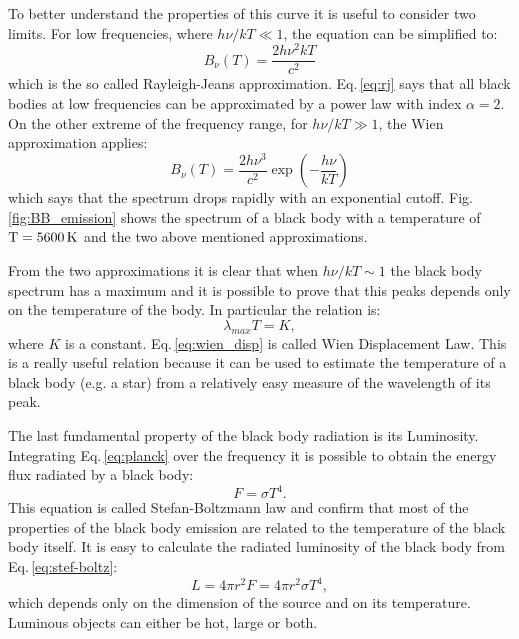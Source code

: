 \documentclass[../main.tex]{subfiles}
\begin{document}
To better understand the properties of this curve it is useful to consider two limits.
For low frequencies, where $h\nu/kT \ll 1$, the equation can be simplified to:
\begin{equation}
    \label{eq:rj}
    B_{\nu}(T) = \frac{2h\nu^2kT}{c^2}
\end{equation}
which is the so called Rayleigh-Jeans approximation.
Eq.\,\ref{eq:rj} says that all black bodies at low frequencies can be approximated by a power law with index $\alpha = 2$.
On the other extreme of the frequency range, for $h\nu/kT \gg 1$, the Wien approximation applies:
\begin{equation}
    \label{eq:wien}
    B_{\nu}(T) = \frac{2h\nu^3}{c^2}\exp\left(-\frac{h\nu}{kT}\right)
\end{equation}
which says that the spectrum drops rapidly with an exponential cutoff.
Fig.\,\ref{fig:BB_emission} shows the spectrum of a black body with a temperature of $\rm T=5600\,\si{K}$ and the two above mentioned approximations.

From the two approximations it is clear that when $h\nu/kT \sim 1$ the black body spectrum has a maximum and it is possible to prove that this peaks depends only on the temperature of the body.
In particular the relation is:
\begin{equation}
    \label{eq:wien_disp}
    \lambda_{max}T=K,
\end{equation}
where $K$ is a constant.
Eq.\,\ref{eq:wien_disp} is called Wien Displacement Law.
This is a really useful relation because it can be used to estimate the temperature of a black body (e.g. a star) from a relatively easy measure of the wavelength of its peak.

The last fundamental property of the black body radiation is its Luminosity.
Integrating Eq.\,\ref{eq:planck} over the frequency it is possible to obtain the energy flux radiated by a black body:
\begin{equation}
    \label{eq:stef-boltz}
    F = \sigma T^4.
\end{equation}
This equation is called Stefan-Boltzmann law and confirm that most of the properties of the black body emission are related to the temperature of the black body itself.
It is easy to calculate the radiated luminosity of the black body from Eq.\,\ref{eq:stef-boltz}:
\begin{equation}
    \label{eq:luminosity}
    L = 4\pi r^2 F = 4\pi r^2\sigma T^4,
\end{equation}
which depends only on the dimension of the source and on its temperature.
Luminous objects can either be hot, large or both.
\end{document}
